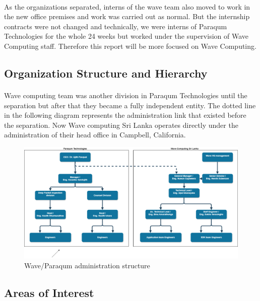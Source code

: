 \paragraph{}
As the organizations separated, interns of the wave team also moved to work in the new office premises and work was carried out as normal. But the internship contracts were not changed and technically, we were interns of Paraqum Technologies for the whole 24 weeks but worked under the supervision of Wave Computing staff. Therefore this report will be more focused on Wave Computing.

\subsection{Organization Structure and Hierarchy}

\paragraph{}
Wave computing team was another division in Paraqum Technologies until the separation but after that they became a fully independent entity. The dotted line in the following diagram represents the administration link that existed before the separation. Now Wave computing Sri Lanka operates directly under the administration of their head office in Campbell, California. 

\begin{figure}[H]
    \centering
    \includegraphics[trim=0cm 0cm 0cm 0cm, clip=true,scale=0.25]{figures/admin_struct.png}
    \caption{Wave/Paraqum administration structure \label{Fig:adminstruct}}\vspace{-4mm}
    \end{figure}

\subsection{Areas of Interest}

